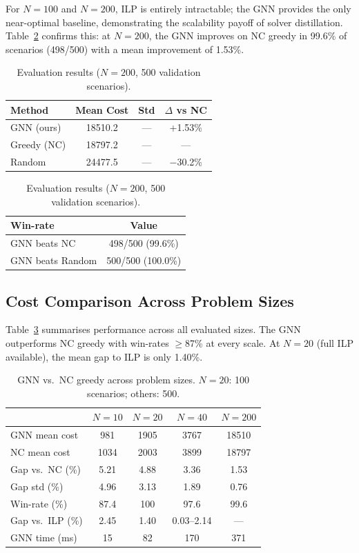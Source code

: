 \documentclass[conference]{IEEEtran}
\begin{document}
For $N{=}100$ and $N{=}200$, ILP is entirely intractable; the GNN provides the only near-optimal baseline, demonstrating the scalability payoff of solver distillation. Table~\ref{tab:results_200obj} confirms this: at $N{=}200$, the GNN improves on NC greedy in 99.6\% of scenarios (498/500) with a mean improvement of 1.53\%.

\begin{table}[htbp]
\caption{Evaluation results ($N{=}200$, 500 validation scenarios).}
\label{tab:results_200obj}
\centering
\begin{tabular}{@{}lccc@{}}
\toprule
\textbf{Method} & \textbf{Mean Cost} & \textbf{Std} & \textbf{$\Delta$ vs NC} \\
\midrule
GNN (ours) & 18510.2 & --- & +1.53\% \\
Greedy (NC) & 18797.2 & --- & \multicolumn{1}{c}{---} \\
Random & 24477.5 & --- & $-$30.2\% \\
\bottomrule
\end{tabular}

\vspace{2mm}
\begin{tabular}{@{}lc@{}}
\toprule
\textbf{Win-rate} & \textbf{Value} \\
\midrule
GNN beats NC & 498/500 (99.6\%) \\
GNN beats Random & 500/500 (100.0\%) \\
\bottomrule
\end{tabular}
\end{table}

\subsection{Cost Comparison Across Problem Sizes}

Table~\ref{tab:cross_size} summarises performance across all evaluated sizes. The GNN outperforms NC greedy with win-rates $\geq$87\% at every scale. At $N{=}20$ (full ILP available), the mean gap to ILP is only 1.40\%.

\begin{table}[htbp]
\caption{GNN vs.\ NC greedy across problem sizes. $N{=}20$: 100 scenarios; others: 500.}
\label{tab:cross_size}
\centering
\begin{tabular}{@{}lcccc@{}}
\toprule
& $N{=}10$ & $N{=}20$ & $N{=}40$ & $N{=}200$ \\
\midrule
GNN mean cost        & 981   & 1905  & 3767  & 18510 \\
NC mean cost         & 1034  & 2003  & 3899  & 18797 \\
Gap vs.\ NC (\%)     & 5.21  & 4.88  & 3.36  & 1.53 \\
Gap std (\%)         & 4.96  & 3.13  & 1.89  & 0.76 \\
Win-rate (\%)        & 87.4  & 100   & 97.6  & 99.6 \\
Gap vs.\ ILP (\%)   & 2.45  & 1.40  & 0.03--2.14 & --- \\
GNN time (ms)        & 15    & 82    & 170   & 371 \\
\bottomrule
\end{tabular}
\end{table}
\end{document}
